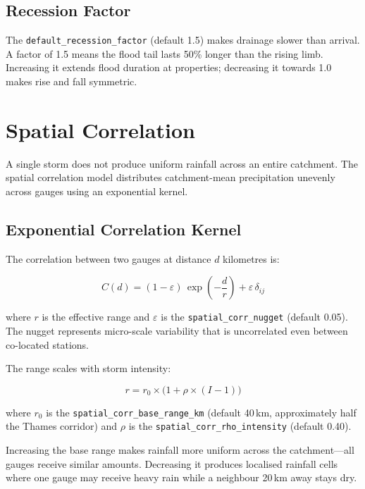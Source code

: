\documentclass[11pt,a4paper]{article}
\begin{document}
\subsection{Recession Factor}

The \texttt{default\_recession\_factor} (default 1.5) makes drainage
slower than arrival.  A factor of 1.5 means the flood tail lasts 50\%
longer than the rising limb.  Increasing it extends flood duration at
properties; decreasing it towards 1.0 makes rise and fall symmetric.


\section{Spatial Correlation}
\label{ch:spatial}

A single storm does not produce uniform rainfall across an entire
catchment.  The spatial correlation model distributes catchment-mean
precipitation unevenly across gauges using an exponential kernel.

\subsection{Exponential Correlation Kernel}

The correlation between two gauges at distance $d$ kilometres is:

\[
  C(d) = (1 - \varepsilon)\,\exp\!\left(-\frac{d}{r}\right) + \varepsilon\,\delta_{ij}
\]

\noindent where $r$ is the effective range and $\varepsilon$ is the
\texttt{spatial\_corr\_nugget} (default 0.05).  The nugget represents
micro-scale variability that is uncorrelated even between co-located
stations.

The range scales with storm intensity:

\[
  r = r_0 \times \bigl(1 + \rho \times (I - 1)\bigr)
\]

\noindent where $r_0$ is the \texttt{spatial\_corr\_base\_range\_km}
(default 40\,km, approximately half the Thames corridor) and $\rho$ is
the \texttt{spatial\_corr\_rho\_intensity} (default 0.40).

Increasing the base range makes rainfall more uniform across the
catchment---all gauges receive similar amounts.  Decreasing it produces
localised rainfall cells where one gauge may receive heavy rain while
a neighbour 20\,km away stays dry.
\end{document}
